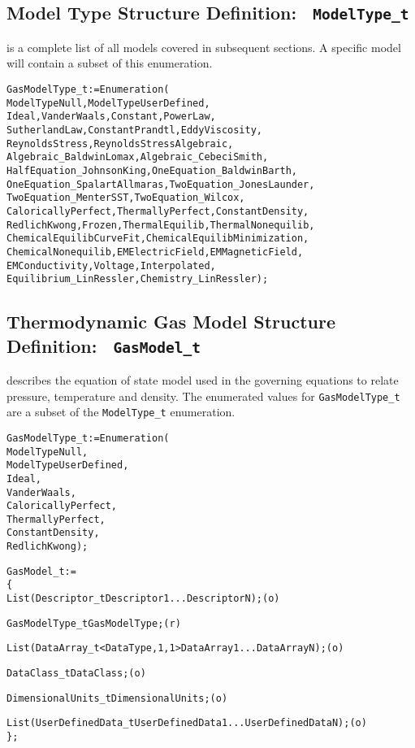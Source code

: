 \subsection{Model Type Structure Definition: \
\texttt{ModelType\_t}}
\label{s:ModelType}

 is a complete list of all models covered in subsequent
sections. A specific model will contain a subset of this enumeration.
\begin{alltt}
  GasModelType_t := Enumeration(
    ModelTypeNull, ModelTypeUserDefined,
    Ideal, VanderWaals, Constant, PowerLaw,
    SutherlandLaw, ConstantPrandtl, EddyViscosity,
    ReynoldsStress, ReynoldsStressAlgebraic,
    Algebraic_BaldwinLomax, Algebraic_CebeciSmith,
    HalfEquation_JohnsonKing, OneEquation_BaldwinBarth,
    OneEquation_SpalartAllmaras, TwoEquation_JonesLaunder,
    TwoEquation_MenterSST, TwoEquation_Wilcox,
    CaloricallyPerfect, ThermallyPerfect, ConstantDensity,
    RedlichKwong, Frozen, ThermalEquilib, ThermalNonequilib,
    ChemicalEquilibCurveFit, ChemicalEquilibMinimization,
    ChemicalNonequilib, EMElectricField, EMMagneticField,
    EMConductivity, Voltage, Interpolated,
    Equilibrium_LinRessler, Chemistry_LinRessler ) ;
\end{alltt}

\subsection{Thermodynamic Gas Model Structure Definition: \
\texttt{GasModel\_t}}
\label{s:GasModel}

 describes the equation of state model used in the
governing equations to relate pressure, temperature and density.
The enumerated values for \texttt{GasModelType\_t} are a subset of the
\texttt{ModelType\_t} enumeration.
\begin{alltt}
  GasModelType\_t := Enumeration(
    ModelTypeNull,
    ModelTypeUserDefined,
    Ideal,
    VanderWaals,
    CaloricallyPerfect,
    ThermallyPerfect,
    ConstantDensity,
    RedlichKwong ) ;
\end{alltt}

\begin{alltt}
  GasModel_t :=
    \{
    List( Descriptor\_t Descriptor1 ... DescriptorN ) ;                      (o)

    GasModelType\_t GasModelType ;                                           (r)
    
    List( DataArray\_t<DataType, 1, 1> DataArray1 ... DataArrayN ) ;         (o)

    DataClass\_t DataClass ;                                                 (o)
                
    DimensionalUnits\_t DimensionalUnits ;                                   (o)

    List( UserDefinedData\_t UserDefinedData1 ... UserDefinedDataN ) ;       (o)
    \} ;
\end{alltt}

